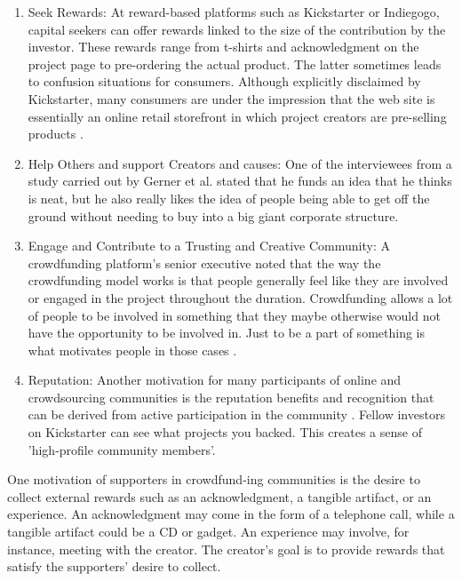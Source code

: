 \begin{enumerate}
      \item Seek Rewards:
            At reward-based platforms such as Kickstarter or Indiegogo, capital seekers can offer rewards linked to the size of the contribution by the investor. These rewards range from t-shirts and
            acknowledgment on the project page to pre-ordering the actual product. The latter sometimes leads
            to confusion situations for consumers. Although explicitly disclaimed by Kickstarter, many consumers
            are under the impression that the web site is essentially an online retail storefront in which project
            creators are pre-selling products \cite{10.2139/ssrn.2234765}.

      \item Help Others and support Creators and causes: One of the interviewees from a study carried out by Gerner et al. \cite{inproceedings}
            stated that he funds an idea that he thinks is neat, but he also really likes the idea of people being
            able to get off the ground without needing to buy into a big giant corporate structure.

      \item Engage and Contribute to a Trusting and Creative Community:
            A crowdfunding platform’s senior executive noted that the way the crowdfunding model works is that people generally feel like they are involved or engaged in the project
            throughout the duration. Crowdfunding allows a lot of people to be involved in something that
            they maybe otherwise would not have the opportunity to be involved in. Just to be a part of something
            is what motivates people in those cases \cite{inproceedings}.

      \item Reputation:
            Another motivation for many participants of online and crowdsourcing communities is
            the reputation benefits and recognition that can be derived from active participation in the community \cite{doi:10.5465/ambpp.2014.209}.
            Fellow investors on Kickstarter can see what projects you backed. This creates a sense of ’high-profile
            community members’.
\end{enumerate}


One motivation of supporters in crowdfund-ing communities is the desire to collect external rewards such as an acknowledgment, a tangible artifact, or an experience. An acknowledgment may come in the form of a telephone call, while a tangible artifact could be a CD or gadget. An experience may involve, for instance, meeting with the creator. The creator’s goal is to provide rewards that satisfy the supporters’ desire to collect.

